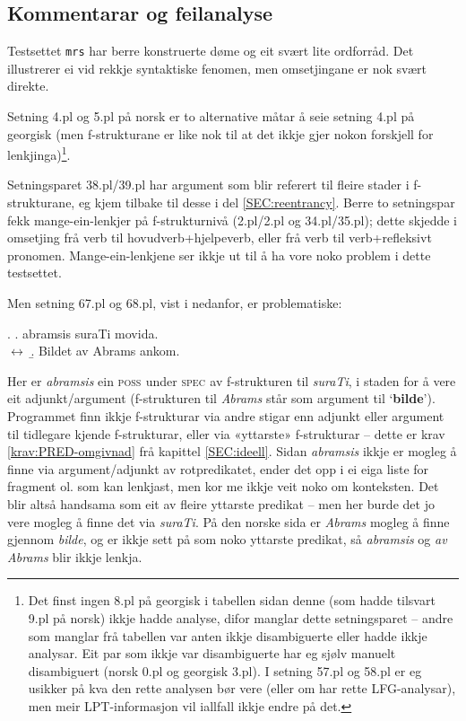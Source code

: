 \documentclass[12pt,a4paper,oneside,draft]{report}
\newcommand{\F}[2]{\textsc{#1}\ensuremath{_{#2}}}
\newcommand{\SPEC}{\F{spec}{}}
\newcommand{\POSS}{\F{poss}{}}
\newcommand{\p}[1]{`\textbf{#1}'}
\begin{document}
\subsection{Kommentarar og feilanalyse}
\label{sec-5.3.1}

\label{SEC:feilanalyse}

Testsettet \texttt{mrs} har berre konstruerte døme og eit svært lite
 ordforråd. Det illustrerer ei vid rekkje syntaktiske fenomen, men
 omsetjingane er nok svært direkte.

Setning 4.pl og 5.pl på norsk er to alternative måtar å seie setning
 4.pl på georgisk (men f-strukturane er like nok til at det ikkje gjer
 nokon forskjell for lenkjinga)\footnote{Det finst ingen 8.pl på georgisk i tabellen sidan denne (som
        hadde tilsvart 9.pl på norsk) ikkje hadde analyse, difor
        manglar dette setningsparet -- andre som manglar frå tabellen
        var anten ikkje disambiguerte eller hadde ikkje analysar. Eit
        par som ikkje var disambiguerte har eg sjølv manuelt
        disambiguert (norsk 0.pl og georgisk 3.pl). I setning 57.pl og
        58.pl er eg usikker på kva den rette analysen bør vere (eller
        om har rette LFG-analysar), men meir LPT-informasjon vil
        iallfall ikkje endre på det. }.

Setningsparet 38.pl/39.pl har argument som blir referert til fleire
 stader i f-strukturane, eg kjem tilbake til desse i del
 \ref{SEC:reentrancy}. Berre to setningspar fekk mange-ein-lenkjer på
 f-strukturnivå (2.pl/2.pl og 34.pl/35.pl); dette skjedde i omsetjing
 frå verb til hovudverb+hjelpeverb, eller frå verb til verb+refleksivt
 pronomen. Mange-ein-lenkjene ser ikkje ut til å ha vore noko problem
 i dette testsettet.

Men setning 67.pl og 68.pl, vist i \Next nedanfor, er problematiske:

\ex. \a. abramsis suraTi movida.\\
     $\leftrightarrow$
     \b. Bildet av Abrams ankom.

Her er \emph{abramsis} ein \POSS{} under \SPEC{} av f-strukturen til
 \emph{suraTi}, i staden for å vere eit adjunkt/argument (f-strukturen til
 \emph{Abrams} står som argument til \p{bilde}). Programmet finn ikkje
 f-strukturar via andre stigar enn adjunkt eller argument til
 tidlegare kjende f-strukturar, eller via «yttarste» f-strukturar --
 dette er krav \ref{krav:PRED-omgivnad} frå kapittel
 \ref{SEC:ideell}. Sidan \emph{abramsis} ikkje er mogleg å finne via
 argument/adjunkt av rotpredikatet, ender det opp i ei eiga liste for
 fragment ol. som kan lenkjast, men kor me ikkje veit noko om
 konteksten. Det blir altså handsama som eit av fleire yttarste
 predikat -- men her burde det jo vere mogleg å finne det via
 \emph{suraTi}. På den norske sida er \emph{Abrams} mogleg å finne gjennom
 \emph{bilde}, og er ikkje sett på som noko yttarste predikat, så
 \emph{abramsis} og \emph{av Abrams} blir ikkje lenkja.
\end{document}
